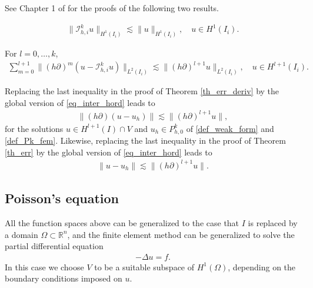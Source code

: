 \documentclass[12pt,oneside,final]{amsart}
\def\p{\partial}
\def\R{\mathbb R}
\def\I{\mathcal I}
\begin{document}
See Chapter 1 of \cite{EG} for the proofs of the following two results. 
\begin{proposition}
    \begin{align*}
\|\I_{h,i}^k u\|_{H^1(I_i)} \lesssim \|u\|_{H^1(I_i)},
\quad u \in H^1(I_i).
    \end{align*}
\end{proposition}

\begin{proposition}
For $l=0,\dots,k$,
    \begin{align}\label{eq_inter_hord}
\sum_{m=0}^{l+1} \|(h\p)^m (u - \I_{h,i}^k u)\|_{L^2(I_i)} \lesssim \|(h\p)^{l+1} u\|_{L^2(I_i)}, 
\quad u \in H^{l+1}(I_i). 
    \end{align}
\end{proposition}

Replacing the last inequality in the proof of Theorem \ref{th_err_deriv} by the global version of \eqref{eq_inter_hord}
leads to
    \begin{align*}
\|(h\partial)(u-u_h)\|
\lesssim
\|(h \partial)^{l+1} u\|,
    \end{align*}
for the solutions 
$u \in H^{l+1}(I) \cap V$ and $u_h \in P_{h,0}^k$ of \eqref{def_weak_form}
and \eqref{def_Pk_fem}. Likewise, replacing the last inequality in the proof of Theorem \ref{th_err} by the global version of \eqref{eq_inter_hord}
leads to
    \begin{align*}
\|u-u_h\|
\lesssim
\|(h \partial)^{l+1} u\|.
    \end{align*}

\subsection{Poisson's equation}

All the function spaces above can be generalized to the case that $I$ is replaced by a domain $\Omega \subset \R^n$,
and the finite element method can be generalized to solve the partial differential equation 
    \begin{align}\label{eq_poisson_nd}
- \Delta u = f.
    \end{align} 
In this case we choose $V$ to be a suitable subspace of $H^1(\Omega)$, depending on the boundary conditions imposed on $u$. 
\end{document}
